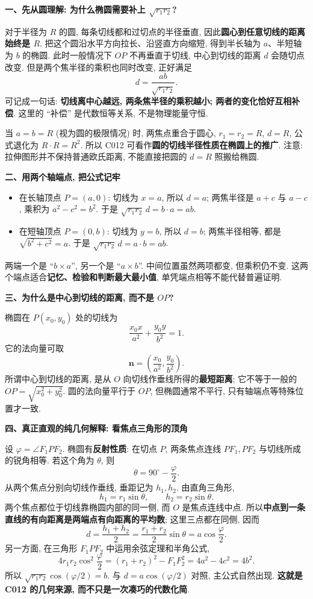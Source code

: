 \begin{explanationbox}
\textbf{一、先从圆理解: 为什么椭圆需要补上 $\sqrt{r_1r_2}$?}

对于半径为 $R$ 的圆, 每条切线都和过切点的半径垂直,
因此\textbf{圆心到任意切线的距离始终是 $R$}.
把这个圆沿水平方向拉长、沿竖直方向缩短, 得到半长轴为 $a$、半短轴为 $b$ 的椭圆.
此时一般情况下 $OP$ 不再垂直于切线, 中心到切线的距离 $d$ 会随切点改变.
但是两个焦半径的乘积也同时改变, 正好满足
\[
 d=\frac{ab}{\sqrt{r_1r_2}}.
\]
可记成一句话: \textbf{切线离中心越远, 两条焦半径的乘积越小; 两者的变化恰好互相补偿}.
这里的 ``补偿'' 是代数恒等关系, 不是物理能量守恒.

当 $a=b=R$ (视为圆的极限情况) 时, 两焦点重合于圆心,
$r_1=r_2=R$, $d=R$, 公式退化为 $R\cdot R=R^2$.
所以 C012 可看作\textbf{圆的切线半径性质在椭圆上的推广}.
注意: 拉伸图形并不保持普通欧氏距离, 不能直接把圆的 $d=R$ 照搬给椭圆.

\textbf{二、用两个轴端点, 把公式记牢}

\begin{itemize}
\item 在长轴顶点 $P=(a,0)$: 切线为 $x=a$, 所以 $d=a$;
两焦半径是 $a+c$ 与 $a-c$, 乘积为 $a^2-c^2=b^2$.
于是 $\sqrt{r_1r_2}\,d=b\cdot a=ab$.
\item 在短轴顶点 $P=(0,b)$: 切线为 $y=b$, 所以 $d=b$;
两焦半径相等, 都是 $\sqrt{b^2+c^2}=a$.
于是 $\sqrt{r_1r_2}\,d=a\cdot b=ab$.
\end{itemize}
两端一个是 ``$b\times a$'', 另一个是 ``$a\times b$''.
中间位置虽然两项都变, 但乘积仍不变.
这两个端点适合\textbf{记忆、检验和判断最大最小值}, 单凭端点相等不能代替普遍证明.

\textbf{三、为什么是中心到切线的距离, 而不是 $OP$?}

椭圆在 $P(x_0,y_0)$ 处的切线为
\[
\frac{x_0x}{a^2}+\frac{y_0y}{b^2}=1.
\]
它的法向量可取
\[
\boldsymbol n=\left(\frac{x_0}{a^2},\frac{y_0}{b^2}\right).
\]
所谓中心到切线的距离, 是从 $O$ 向切线作垂线所得的\textbf{最短距离};
它不等于一般的 $OP=\sqrt{x_0^2+y_0^2}$.
圆的法向量平行于 $OP$, 但椭圆通常不平行, 只有轴端点等特殊位置才一致.

\textbf{四、真正直观的纯几何解释: 看焦点三角形的顶角}

设 $\varphi=\angle F_1PF_2$.
椭圆有\textbf{反射性质}: 在切点 $P$, 两条焦点连线 $PF_1,PF_2$ 与切线所成的锐角相等.
若这个角为 $\theta$, 则
\[
\theta=90^\circ-\frac\varphi2.
\]
从两个焦点分别向切线作垂线, 垂距记为 $h_1,h_2$.
由直角三角形,
\[
h_1=r_1\sin\theta,\qquad h_2=r_2\sin\theta.
\]
两个焦点都位于切线靠椭圆内部的同一侧, 而 $O$ 是焦点连线中点.
所以\textbf{中点到一条直线的有向距离是两端点有向距离的平均数}; 这里三点都在同侧, 因而
\[
d=\frac{h_1+h_2}{2}
=\frac{r_1+r_2}{2}\sin\theta
=a\cos\frac\varphi2.
\]
另一方面, 在三角形 $F_1PF_2$ 中运用余弦定理和半角公式,
\[
4r_1r_2\cos^2\frac\varphi2
=(r_1+r_2)^2-F_1F_2^2
=4a^2-4c^2=4b^2.
\]
所以 $\sqrt{r_1r_2}\cos(\varphi/2)=b$.
与 $d=a\cos(\varphi/2)$ 对照, 主公式自然出现.
\textbf{这就是 C012 的几何来源, 而不只是一次凑巧的代数化简}.


\end{explanationbox}
